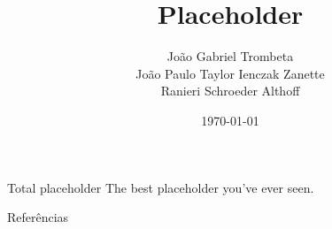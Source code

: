 \documentclass{beamer}
\title{Placeholder}
\author{João Gabriel Trombeta\\
        João Paulo Taylor Ienczak Zanette\\
        Ranieri Schroeder Althoff}
\date{\today}
\begin{document}
\maketitle{}

\begin{frame}{Total placeholder}
    The best placeholder you've ever seen.
\end{frame}



\begin{frame}{Referências}
    \nocite{*}
    
\end{frame}
\end{document}
